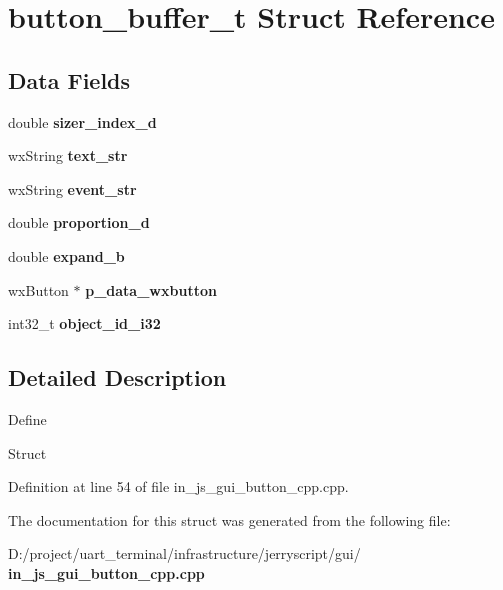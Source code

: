 \section{button\+\_\+buffer\+\_\+t Struct Reference}
\label{structbutton__buffer__t}
\subsection*{Data Fields}
\begin{DoxyCompactItemize}
\item 
\mbox{\label{structbutton__buffer__t_aae99f717aadbf88f890c71a293468af8}} 
double {\bfseries sizer\+\_\+index\+\_\+d}
\item 
\mbox{\label{structbutton__buffer__t_ae027b01a16a8b9ded760f0ead4d7a951}} 
wx\+String {\bfseries text\+\_\+str}
\item 
\mbox{\label{structbutton__buffer__t_a43aba9d4f0f518678c2dd03b5bfd9e7e}} 
wx\+String {\bfseries event\+\_\+str}
\item 
\mbox{\label{structbutton__buffer__t_a93e3ac3895fbb25863fb66af78e0ed39}} 
double {\bfseries proportion\+\_\+d}
\item 
\mbox{\label{structbutton__buffer__t_a40506be5f1249944fed816e11465f5ca}} 
double {\bfseries expand\+\_\+b}
\item 
\mbox{\label{structbutton__buffer__t_aee48a11d69f9dacba25d92b60ae86d63}} 
wx\+Button $\ast$ {\bfseries p\+\_\+data\+\_\+wxbutton}
\item 
\mbox{\label{structbutton__buffer__t_aa7683407966206b7eb17d410ee75d880}} 
int32\+\_\+t {\bfseries object\+\_\+id\+\_\+i32}
\end{DoxyCompactItemize}


\subsection{Detailed Description}
Define

Struct 

Definition at line 54 of file in\+\_\+js\+\_\+gui\+\_\+button\+\_\+cpp.\+cpp.



The documentation for this struct was generated from the following file\+:\begin{DoxyCompactItemize}
\item 
D\+:/project/uart\+\_\+terminal/infrastructure/jerryscript/gui/\textbf{ in\+\_\+js\+\_\+gui\+\_\+button\+\_\+cpp.\+cpp}\end{DoxyCompactItemize}

